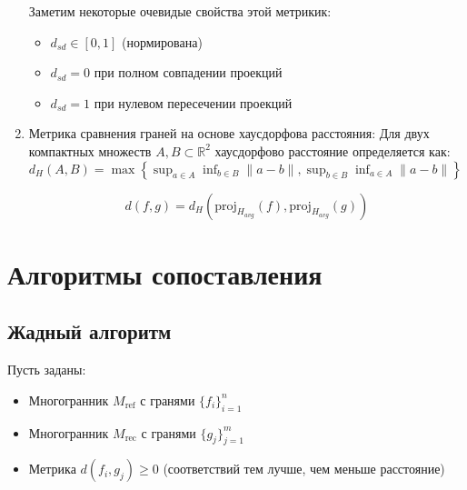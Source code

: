 \documentclass[a4paper,14pt]{extarticle}
\begin{document}
\begin{enumerate}
        Заметим некоторые очевидые свойства этой метрикик:
        \begin{itemize}
            \item $d_{sd} \in [0,1]$ (нормирована)
            \item $d_{sd} = 0$ при полном совпадении проекций
            \item $d_{sd} = 1$ при нулевом пересечении проекций
        \end{itemize}


    \item Метрика сравнения граней на основе хаусдорфова расстояния:
        Для двух компактных множеств $A,B \subset \mathbb{R}^2$ хаусдорфово расстояние определяется как:
        $d_H(A,B) = \max\left\{\sup_{a \in A} \inf_{b \in B} \|a - b\|, \sup_{b \in B} \inf_{a \in A} \|a - b\|\right\}$

        \begin{equation}
            d(f,g) = d_H(\text{proj}_{H_{avg}}(f), \text{proj}_{H_{avg}}(g))
        \end{equation}

\end{enumerate}

\section{Алгоритмы сопоставления}

\subsection{Жадный алгоритм}
Пусть заданы:
\begin{itemize}
    \item Многогранник $M_{\text{ref}}$ с гранями $\{f_i\}_{i=1}^n$
    \item Многогранник $M_{\text{rec}}$ с гранями $\{g_j\}_{j=1}^m$
    \item Метрика $d(f_i, g_j) \geq 0$ (соответствий тем лучше, чем меньше расстояние)
\end{itemize}
\end{document}
